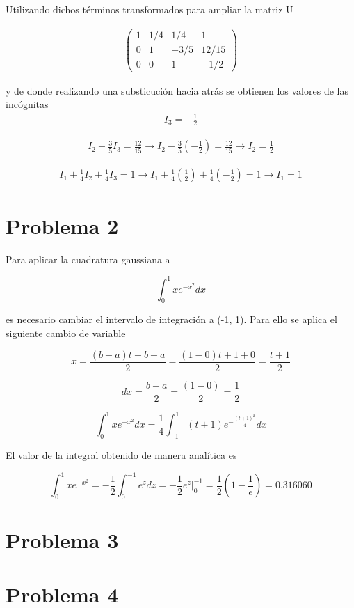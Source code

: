 \documentclass[a4paper, 12pt]{article}
\begin{document}
Utilizando dichos términos transformados para ampliar la matriz U

\begin{align*}
\begin{pmatrix}
  1 & 1/4 & 1/4 & 1\\
  0 & 1 & -3/5 & 12/15 \\
  0 & 0 & 1 & -1/2
\end{pmatrix}
\end{align*}

y de donde realizando una substicución hacia atrás se obtienen los valores de
las incógnitas
\begin{align*}
I_3 = -\frac{1}{2}
\end{align*}

\begin{align*}
I_2 - \frac{3}{5}I_3 = \frac{12}{15} 
\rightarrow
I_2 - \frac{3}{5}(-\frac{1}{2}) = \frac{12}{15}
\rightarrow
I_2 = \frac{1}{2}
\end{align*}

\begin{align*}
I_1 + \frac{1}{4}I_2 + \frac{1}{4}I_3 = 1 
\rightarrow
I_1 + \frac{1}{4}(\frac{1}{2}) + \frac{1}{4}(-\frac{1}{2}) = 1 
\rightarrow
I_1 = 1
\end{align*}

\section*{Problema 2}
Para aplicar la cuadratura gaussiana a 

\begin{equation*}
	\int^{1}_{0} x e^{-x^2} dx
\end{equation*}

es necesario cambiar el intervalo de integración a (-1, 1). Para ello se aplica
el siguiente cambio de variable

\begin{equation*}
x = \frac{(b - a)t + b + a}{2} = \frac{(1 - 0)t + 1 + 0}{2} = \frac{t + 1}{2}
\end{equation*}

\begin{equation*}
dx = \frac{b - a}{2} = \frac{(1 - 0)}{2} = \frac{1}{2}
\end{equation*}

\begin{equation*}
	\int^{1}_{0} x e^{-x^2} dx =
	\frac{1}{4}\int^{1}_{-1} (t + 1) e^{-\frac{(t + 1)^2}{4}} dx
\end{equation*}

El valor de la integral obtenido de manera analítica es

\begin{equation*}
  \int^1_0 x e^{-x^2} = -\frac{1}{2} \int^{-1}_0 e^z dz =
  -\frac{1}{2} e^z|^{-1}_{0} = \frac{1}{2}(1-\frac{1}{e}) = 0.316060
\end{equation*}

\section*{Problema 3}

\section*{Problema 4}
\end{document}
